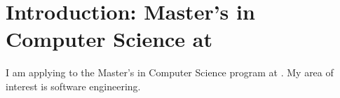 \section*{Introduction: Master’s in Computer Science at \schoolShort}
I am applying to the Master’s in Computer Science program at \schoolLong. 
My area of interest is software engineering.